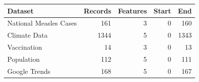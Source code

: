 \begin{tabular}{lrrrr}
\toprule
Dataset & Records & Features & Start & End \\
\midrule
National Measles Cases & 161 & 3 & 0 & 160 \\
Climate Data & 1344 & 5 & 0 & 1343 \\
Vaccination & 14 & 3 & 0 & 13 \\
Population & 112 & 5 & 0 & 111 \\
Google Trends & 168 & 5 & 0 & 167 \\
\bottomrule
\end{tabular}
